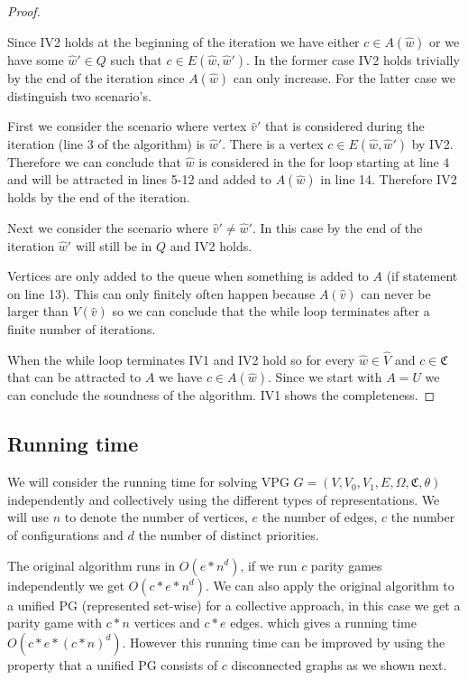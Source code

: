 \begin{theorem}
\begin{proof}
\begin{itemize}
			Since IV2 holds at the beginning of the iteration we have either $c \in A(\hat{w})$ or we have some $\hat{w}' \in Q$ such that $c \in E(\hat{w},\hat{w}')$. In the former case IV2 holds trivially by the end of the iteration since $A(\hat{w})$ can only increase. For the latter case we distinguish two scenario's. 
			
			First we consider the scenario where vertex $\hat{v}'$ that is considered during the iteration (line 3 of the algorithm) is $\hat{w}'$. There is a vertex $c \in E(\hat{w},\hat{w}')$ by IV2. Therefore we can conclude that $\hat{w}$ is considered in the for loop starting at line $4$ and will be attracted in lines 5-12 and added to $A(\hat{w})$ in line 14. Therefore IV2 holds by the end of the iteration.
			
			Next we consider the scenario where $\hat{v}' \neq \hat{w}'$. In this case by the end of the iteration $\hat{w}'$ will still be in $Q$ and IV2 holds.
		\end{itemize}
	
	Vertices are only added to the queue when something is added to $A$ (if statement on line 13). This can only finitely often happen because $A(\hat{v})$ can never be larger than $V(\hat{v})$ so we can conclude that the while loop terminates after a finite number of iterations.
	
		When the while loop terminates IV1 and IV2 hold so for every $\hat{w} \in \hat{V}$ and $c \in \mathfrak{C}$ that can be attracted to $A$ we have $c \in A(\hat{w})$. Since we start with $A = U$ we can conclude the soundness of the algorithm. IV1 shows the completeness.
	\end{proof}
\end{theorem}


\subsection{Running time}
We will consider the running time for solving VPG $G = (V,V_0,V_1,E,\Omega,\mathfrak{C},\theta)$ independently and collectively using the different types of representations. We will use $n$ to denote the number of vertices, $e$ the number of edges, $c$ the number of configurations and $d$ the number of distinct priorities.

The original algorithm runs in $O(e * n^d)$, if we run $c$ parity games independently we get $O(c * e * n ^d)$. We can also apply the original algorithm to a unified PG (represented set-wise) for a collective approach, in this case we get a parity game with $c*n$ vertices and $c*e$ edges. which gives a running time $O(c*e*(c*n)^d)$. However this running time can be improved by using the property that a unified PG consists of $c$ disconnected graphs as we shown next.

